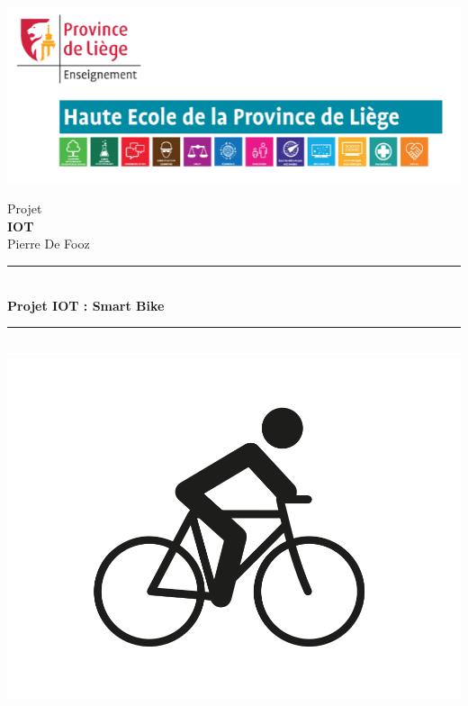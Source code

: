 \author{Andrea Spelgatti}
\begin{titlepage}
		\begin{flushleft}
			\begin{bfseries}
				\includegraphics[scale = 1]{media/images/HEPL.PNG}
			\end{bfseries}
		\end{flushleft}
		\hspace{2cm}
		\begin{center}
			\begin{center}
				\begin{Large}
					Projet \\[1cm]
					\textbf{IOT}\\
					Pierre De Fooz\\[1.5cm]
				\end{Large}
			\end{center}
			\rule{\linewidth}{0.5mm}\\[0.5cm]
			{\huge\bfseries Projet IOT : Smart Bike}
			\rule{\linewidth}{0.5mm}\\[2cm]
			\includegraphics[scale = 0.2]{media/images/velo}

\end{center}
\end{titlepage}
